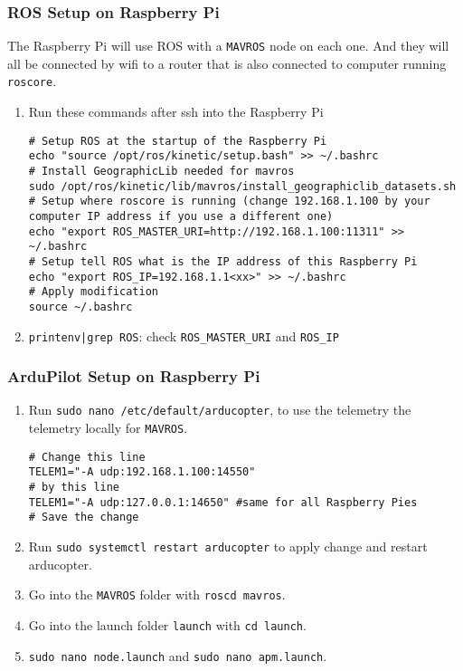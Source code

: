             \subsubsection{ROS Setup on Raspberry Pi}
        
                The Raspberry Pi will use ROS with a \texttt{MAVROS} node on each one. And they will all be connected by wifi to a router that is also connected to computer running \texttt{roscore}.
                \begin{enumerate}
                    \item Run these commands after ssh into the Raspberry Pi
                
                    \begin{verbatim}
# Setup ROS at the startup of the Raspberry Pi
echo "source /opt/ros/kinetic/setup.bash" >> ~/.bashrc
# Install GeographicLib needed for mavros
sudo /opt/ros/kinetic/lib/mavros/install_geographiclib_datasets.sh
# Setup where roscore is running (change 192.168.1.100 by your computer IP address if you use a different one)
echo "export ROS_MASTER_URI=http://192.168.1.100:11311" >> ~/.bashrc
# Setup tell ROS what is the IP address of this Raspberry Pi
echo "export ROS_IP=192.168.1.1<xx>" >> ~/.bashrc
# Apply modification
source ~/.bashrc
                    \end{verbatim}
                    \item \texttt{printenv|grep ROS}: check \texttt{ROS\_MASTER\_URI} and \texttt{ROS\_IP} 
                \end{enumerate}
            
            \subsubsection{ArduPilot Setup on Raspberry Pi}
                \begin{enumerate}
                    \item Run \texttt{sudo nano /etc/default/arducopter}, to use the telemetry the telemetry locally for \texttt{MAVROS}.
                    
                    \begin{verbatim}
# Change this line
TELEM1="-A udp:192.168.1.100:14550"
# by this line
TELEM1="-A udp:127.0.0.1:14650" #same for all Raspberry Pies
# Save the change
                    \end{verbatim}

                    \item Run \texttt{sudo systemctl restart arducopter} to apply change and restart arducopter.
                    \item Go into the \texttt{MAVROS} folder with \texttt{roscd mavros}.
                    \item Go into the launch folder \texttt{launch} with \texttt{cd launch}.
                    \item \texttt{sudo nano node.launch} and \texttt{sudo nano apm.launch}.
                \end{enumerate}
                
